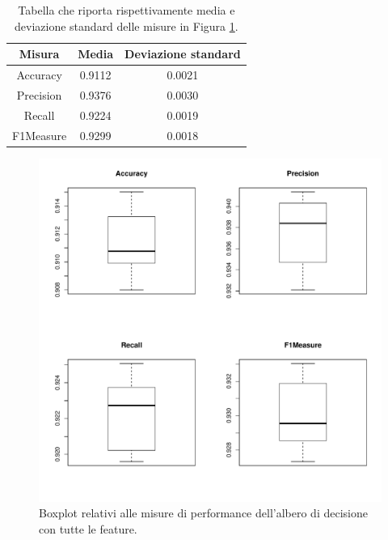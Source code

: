 \begin{table}[h!]
	\caption{Tabella che riporta rispettivamente media e deviazione standard delle misure in Figura \ref{fig:treeperformance}.}
	\label{tab:treeperformance}
	\centering
	\begin{tabular}{c|cc}
		Misura & Media & Deviazione standard \\
		\hline
		Accuracy & 0.9112 & 0.0021 \\ 
		Precision & 0.9376 & 0.0030 \\
		Recall & 0.9224 & 0.0019 \\
		F1Measure & 0.9299 & 0.0018 \\
	\end{tabular}
\end{table}
\begin{figure}[h!]
	\centering
	\includegraphics[width=0.7\linewidth]{../FinalResults/Tree_performance}
	\caption{Boxplot relativi alle misure di performance dell'albero di decisione con tutte le feature.}
	\label{fig:treeperformance}
\end{figure}
